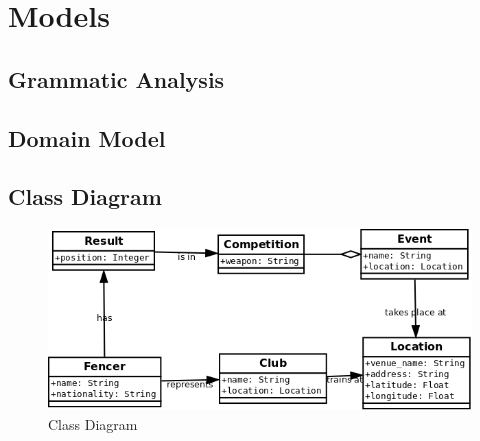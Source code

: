 \chapter{Models}
\section{Grammatic Analysis}
\citep{bf-comp-guide}
\section{Domain Model}
\section{Class Diagram}
  \begin{figure}[!ht]
    \includegraphics[width=\textwidth]{class_diagram}
    \caption{Class Diagram}
  \end{figure}